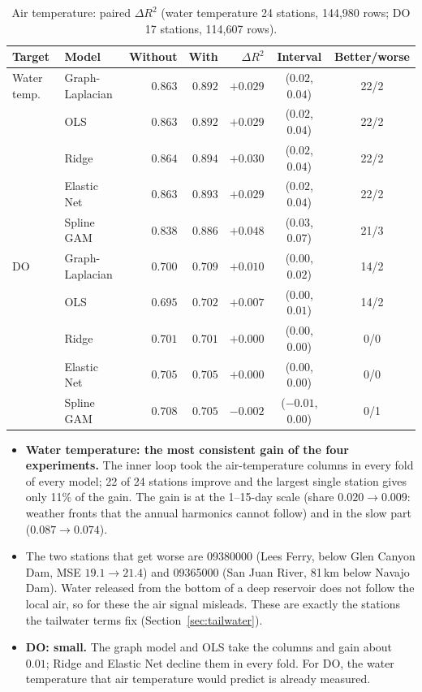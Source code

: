 \documentclass[11pt]{article}
\begin{document}
\begin{table}[h]
\centering
\small
\caption{Air temperature: paired $\Delta R^2$ (water temperature 24 stations, 144{,}980 rows;
DO 17 stations, 114{,}607 rows).}
\label{tab:airtemp}
\begin{tabular}{ll rrrcc}
\toprule
Target & Model & Without & With & $\Delta R^2$ & Interval & Better/worse \\
\midrule
Water temp.   & Graph-Laplacian & $0.863$ & $0.892$ & $\mathbf{+0.029}$ & ($0.02$, $0.04$) & 22/2 \\
              & OLS             & $0.863$ & $0.892$ & $\mathbf{+0.029}$ & ($0.02$, $0.04$) & 22/2 \\
              & Ridge           & $0.864$ & $0.894$ & $\mathbf{+0.030}$ & ($0.02$, $0.04$) & 22/2 \\
              & Elastic Net     & $0.863$ & $0.893$ & $\mathbf{+0.029}$ & ($0.02$, $0.04$) & 22/2 \\
              & Spline GAM      & $0.838$ & $0.886$ & $\mathbf{+0.048}$ & ($0.03$, $0.07$) & 21/3 \\
\addlinespace
DO            & Graph-Laplacian & $0.700$ & $0.709$ & $\mathbf{+0.010}$ & ($0.00$, $0.02$) & 14/2 \\
              & OLS             & $0.695$ & $0.702$ & $\mathbf{+0.007}$ & ($0.00$, $0.01$) & 14/2 \\
              & Ridge           & $0.701$ & $0.701$ & $+0.000$ & ($0.00$, $0.00$) & 0/0 \\
              & Elastic Net     & $0.705$ & $0.705$ & $+0.000$ & ($0.00$, $0.00$) & 0/0 \\
              & Spline GAM      & $0.708$ & $0.705$ & $-0.002$ & ($-0.01$, $0.00$) & 0/1 \\
\bottomrule
\end{tabular}
\end{table}

\begin{itemize}
  \item \textbf{Water temperature: the most consistent gain of the four experiments.} The inner
        loop took the air-temperature columns in every fold of every model; 22 of 24 stations
        improve and the largest single station gives only 11\% of the gain. The gain is at the
        1--15-day scale (share $0.020\to0.009$: weather fronts that the annual harmonics cannot
        follow) and in the slow part ($0.087\to0.074$).
  \item The two stations that get worse are 09380000 (Lees Ferry, below Glen Canyon Dam, MSE
        $19.1\to21.4$) and 09365000 (San Juan River, 81\,km below Navajo Dam). Water released from the bottom
        of a deep reservoir does not follow the local air, so for these the air signal misleads.
        These are exactly the stations the tailwater terms fix (Section~\ref{sec:tailwater}).
  \item \textbf{DO: small.} The graph model and OLS take the columns and gain about $0.01$;
        Ridge and Elastic Net decline them in every fold. For DO, the water temperature that
        air temperature would predict is already measured.
\end{itemize}
\end{document}
